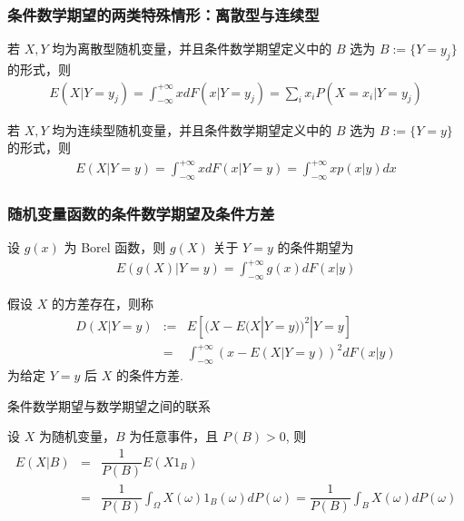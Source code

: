 \documentclass[Prob-All.tex]{subfiles}
\begin{document}
\begin{frame}
	\frametitle{条件数学期望的两类特殊情形：离散型与连续型}
	\begin{thm}
		若 $X,Y$ 均为离散型随机变量，并且条件数学期望定义中的 $B$ 选为 $B:=\{Y=y_j\}$ 的形式，则
		\begin{eqnarray*}
			E(X|Y=y_j)=\int_{-\infty}^{+\infty}xdF(x|Y=y_j)=\sum_{i}x_iP(X=x_i|Y=y_j)
		\end{eqnarray*}

	\end{thm}
	\pause
	\begin{thm}
		若 $X,Y$ 均为连续型随机变量，并且条件数学期望定义中的 $B$ 选为 $B:=\{Y=y\}$ 的形式，则
		\begin{eqnarray*}
			E(X|Y=y)=\int_{-\infty}^{+\infty}xdF(x|Y=y)=\int_{-\infty}^{+\infty}xp(x|y)dx
		\end{eqnarray*}
	\end{thm}

\end{frame}
\begin{frame}
	\frametitle{随机变量函数的条件数学期望及条件方差}
	\begin{thm}
		设 $g (x)$ 为 Borel 函数，则 $g (X)$ 关于 $Y=y$ 的条件期望为
		\begin{eqnarray*}
			E(g(X)|Y=y)=\int_{-\infty}^{+\infty}g(x)dF(x|y)
		\end{eqnarray*}
	\end{thm}
	\pause
	\begin{defi}
		假设 $X$ 的方差存在，则称
		\begin{eqnarray*}
			D(X|Y=y)&:=&E[(X-E(X|Y=y))^2|Y=y]\\
			&=&\int_{-\infty}^{+\infty}(x-E(X|Y=y))^2dF(x|y)
		\end{eqnarray*}
		为给定 $Y=y$ 后 $X$ 的条件方差.
	\end{defi}


\end{frame}




\begin{frame}{条件数学期望与数学期望之间的联系}
\begin{thm}
设 $X$ 为随机变量，$B$ 为任意事件，且 $P(B)>0$, 则
		\begin{eqnarray*}
			E(X|B)&=&\dfrac{1}{P(B)}E(X1_B)\\
			&=&\dfrac{1}{P(B)}\int_{\Omega}X(\omega)1_{B}(\omega)dP(\omega)
			=\dfrac{1}{P(B)}\int_{B}X(\omega)dP(\omega)
		\end{eqnarray*}
\end{thm}

\pause




\end{frame}
\end{document}

